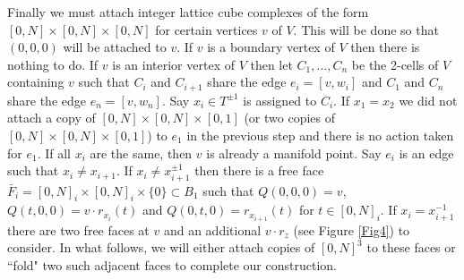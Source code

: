 \documentclass[12pt]{article}
\numberwithin{equation}{section}
\begin{document}
Finally we must attach integer lattice cube complexes of the form $[0,N]\times [0,N]\times [0,N]$ %
for certain vertices $v$ of $V$. This will be done so that $(0,0,0)$ will be attached to $v$. If $v$ is a boundary vertex of $V$ then there is nothing to do. If $v$ is an interior vertex of $V$ then let $C_1,\ldots ,C_n$ be the 2-cells of $V$ containing $v$ such that $C_i$ and $C_{i+1}$ share the edge $e_i=[v,w_i]$ and $C_1$ and $C_n$ share the edge $e_n=[v,w_n]$. Say $x_i\in T^{\pm 1}$ is assigned to $C_i$. If $x_1=x_2$ we did not attach a copy of $[0,N]\times [0,N]\times [0,1]$ (or two copies of $[0,N]\times [0,N]\times [0,1]$) to $e_1$ in the previous step and there is no action taken for $e_1$. If all $x_i$ are the same, then $v$ is already a manifold point. Say $e_i$ is an edge such that $x_i\ne x_{i+1}$. If $x_i\ne x_{i+1}^{\pm 1}$ then there is a free face $\bar F_i=[0,N]_i\times[0,N]_i\times \{0\}\subset B_1$ such that $Q(0,0,0)=v$, $Q(t,0,0)=v\cdot r_{x_i}(t)$ and $Q(0,t,0)=r_{x_{i+1}}(t)$ for $t\in [0,N]_i$. If $x_i=x_{i+1}^{-1}$ there are two free faces at $v$ and an additional $v\cdot r_z$ (see Figure \ref{Fig4}) to consider. In what follows, we will either attach copies of $[0,N]^3$ to these faces or ``fold" two such adjacent faces to complete our construction. 
\end{document}
